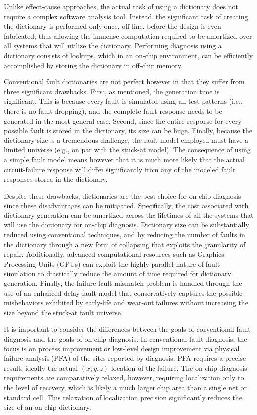 Unlike effect-cause approaches, the actual task of using a dictionary does not require a complex software analysis tool.
%
Instead, the significant task of creating the dictionary is performed only once, off-line, before the design is even fabricated, thus allowing the immense computation required to be amortized over all systems that will utilize the dictionary.
%
Performing diagnosis using a dictionary consists of lookups, which in an on-chip environment, can be efficiently accomplished by storing the dictionary in off-chip memory.

Conventional fault dictionaries are not perfect however in that they suffer from three significant drawbacks.
%
First, as mentioned, the generation time is significant.
%
This is because every fault is simulated using all test patterns (i.e., there is no fault dropping), and the complete fault response needs to be generated in the most general case.
%
Second, since the entire response for every possible fault is stored in the dictionary, its size can be huge.
%
Finally, because the dictionary size is a tremendous challenge, the fault model employed must have a limited universe (e.g., on par with the stuck-at model).
%
The consequence of using a simple fault model means however that it is much more likely that the actual circuit-failure response will differ significantly from any of the modeled fault responses stored in the dictionary.

Despite these drawbacks, dictionaries are the best choice for on-chip diagnosis since these disadvantages can be mitigated.
%
Specifically, the cost associated with dictionary generation can be amortized across the lifetimes of all the systems that will use the dictionary for on-chip diagnosis.
%
Dictionary size can be substantially reduced using conventional techniques, and by reducing the number of faults in the dictionary through a new form of collapsing that exploits the granularity of repair.
%
Additionally, advanced computational resources such as Graphics Processing Units (GPUs) can exploit the highly-parallel nature of fault simulation to drastically reduce the amount of time required for dictionary generation.
%
Finally, the failure-fault mismatch problem is handled through the use of an enhanced delay-fault model that conservatively captures the possible misbehaviors exhibited by early-life and wear-out failures without increasing the size beyond the stuck-at fault universe.

It is important to consider the differences between the goals of conventional fault diagnosis and the goals of on-chip diagnosis.
%
In conventional fault diagnosis, the focus is on process improvement or low-level design improvement via physical failure analysis (PFA) of the sites reported by diagnosis.
%
PFA requires a precise result, ideally the actual $(x, y, z)$ location of the failure.
%
The on-chip diagnosis requirements are comparatively relaxed, however, requiring localization only to the level of recovery, which is likely a much larger chip area than a single net or standard cell.
%
This relaxation of localization precision significantly reduces the size of an on-chip dictionary.



